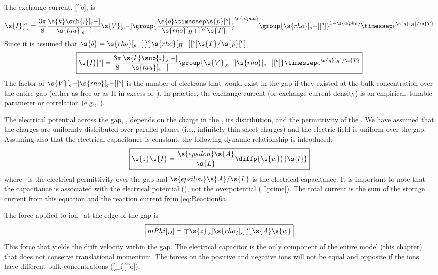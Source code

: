 The exchange current, [^o], is
\begin{equation}
  \s{I}[^o] = \frac{3\pi}{8}\frac{\s{k}\sub{_i}[_e-]}{\s{tau}[_e-]}\s{V}[_e-]\group{\frac{\s{b}\timessep\s{p}[^o]}{\s{rho}[_H+][^o]\s{T}}}^{\s{alpha}}\group{\s{rho}[_e-][^o]}^{1 - \s{alpha}}\timessep e^{\s{g}[_H]/\s{T}}
\end{equation}
Since it is assumed that $\s{b} = \s{rho}[_e-][^o]\s{rho}[_H+][^o]\s{T}/\s{p}[^o]$,
\begin{equation}
  \boxed{\s{I}[^o] = \frac{3\pi}{8}\frac{\s{k}\sub{_i}[_e-]}{\s{tau}[_e-]}\group{\s{V}[_e-]\s{rho}[_e-][^o]}\timessep e^{\s{g}[_H]/\s{T}}}
\end{equation}
The factor of $\s{V}[_e-]\s{rho}[_e-][^o]$ is the number of electrons that would exist in the gap if they existed at the bulk concentration over the entire gap (either as free  or as H in excess of~).  In practice, the exchange current (or exchange current density) is an empirical, tunable parameter or correlation (e.g.,~\cite{Sivertsen2005}).  

The electrical potential across the gap, , depends on the charge in the , its distribution, and the permittivity of the .  We have assumed that the charges are uniformly distributed over parallel planes (i.e., infinitely thin sheet charges) and the electric field is uniform over the gap.  Assuming also that the electrical capacitance is constant, the following dynamic relationship is introduced:
\begin{equation}
  \label{eq:ElectricalCap}
  \boxed{\s{z}\s{I} = \frac{\s{epsilon}\s{A}}{\s{L}}\diffp{\s{w}}{\s{t}}}
\end{equation}
where ~is the electrical permittivity over the gap and $\s{epsilon}\s{A}/\s{L}$ is the electrical capacitance.  It is important to note that the capacitance is associated with the electrical potential (), not the overpotential ([^prime]).  The total current is the sum of the storage current from this equation and the reaction current from \autoref{eq:Reaction6a}.

The force applied to ion~ at the edge of the gap is 
\begin{equation}
  \boxed{\dot{mPhi}[_D] = \mp\s{z}[_i]\s{rho}[_i][^o]\s{A}\s{w}}
\end{equation}
This force that yields the drift velocity within the gap.  The electrical capacitor is the only component of the entire model (this chapter) that does not conserve translational momentum.  The forces on the positive and negative ions will not be equal and opposite if the ions have different bulk concentrations ([_i][^o]). 
 


